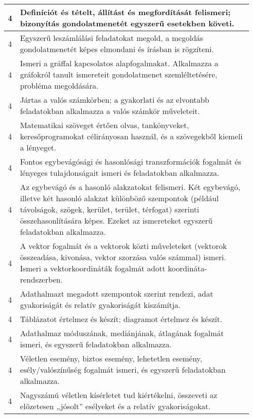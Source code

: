 \begin{longtable}{c | p{12cm} }
                                
                                          4 &  Definíciót és tételt, állítást és megfordítását felismeri; bizonyítás gondolatmenetét egyszerű esetekben követi. \\ \hline
                                          4 &  Egyszerű leszámlálási feladatokat megold, a megoldás gondolatmenetét képes elmondani és írásban is rögzíteni. \\ \hline
                                          4 &  Ismeri a gráffal kapcsolatos alapfogalmakat. Alkalmazza a gráfokról tanult ismereteit gondolatmenet szemléltetésére, probléma megoldására. \\ \hline
                                          4 &  Jártas a valós számkörben; a gyakorlati és az elvontabb feladatokban alkalmazza a valós számkör műveleteit. \\ \hline
                                          4 &  Matematikai szöveget értően olvas, tankönyveket, keresőprogramokat célirányosan használ, és a szövegekből kiemeli a lényeget. \\ \hline
                                          4 &  Fontos egybevágósági és hasonlósági transzformációk fogalmát  és lényeges tulajdonságait ismeri és feladatokban alkalmazza. \\ \hline
                                          4 &  Az egybevágó és a hasonló alakzatokat felismeri. Két egybevágó, illetve két hasonló alakzat különböző szempontok (például távolságok, szögek, kerület, terület, térfogat) szerinti összehasonlítására képes. Ezeket az ismereteket egyszerű feladatokban alkalmazza. \\ \hline
                                          4 &  A vektor fogalmát és a vektorok közti műveleteket (vektorok összeadása, kivonása, vektor szorzása valós számmal) ismeri. Ismeri a vektorkoordináták fogalmát adott koordináta-rendszerben. \\ \hline
                                          4 &  Adathalmazt megadott szempontok szerint rendezi, adat gyakoriságát és relatív gyakoriságát kiszámítja. \\ \hline
                                          4 &  Táblázatot értelmez és készít; diagramot értelmez és készít. \\ \hline
                                          4 &  Adathalmaz móduszának, mediánjának, átlagának fogalmát ismeri, és egyszerű feladatokban alkalmazza. \\ \hline
                                          4 &  Véletlen esemény, biztos esemény, lehetetlen esemény, esély/valószínűség fogalmát ismeri, és egyszerű feladatokban alkalmazza. \\ \hline
                                          4 &  Nagyszámú véletlen kísérletet tud kiértékelni, összeveti az előzetesen „jósolt” esélyeket és a relatív gyakoriságokat. \\ \hline
                                      
                        \end{longtable}
            \clearpage

